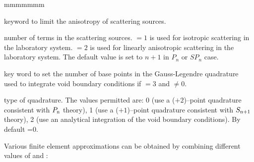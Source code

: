 \begin{ListeDeDescription}{mmmmmmm}
\item[\moc{SCAT}] keyword to limit the anisotropy of scattering sources.

\item[\dusa{iscat}] number of terms in the scattering sources.  $=1$ is used for
isotropic scattering in the laboratory system.  $=2$ is used for
linearly anisotropic scattering in the laboratory system. The default value is set to $n+1$
in $P_n$ or $SP_n$ case.

\item[\moc{VOID}] key word to set the number of base points in the Gauss-Legendre quadrature used to integrate
void boundary conditions if  $=3$ and  $\ne 0$.

\item[\dusa{nvd}] type of quadrature. The values
permitted are: 0 (use a ($+2$)--point quadrature consistent with $P_{{\rm n}}$ theory),
1 (use a ($+1$)--point quadrature consistent with $S_{{\rm n}+1}$ theory),
2 (use an analytical integration of the void boundary conditions). By default =0.

\end{ListeDeDescription}

Various finite element approximations can be obtained by combining different
values of  and :

